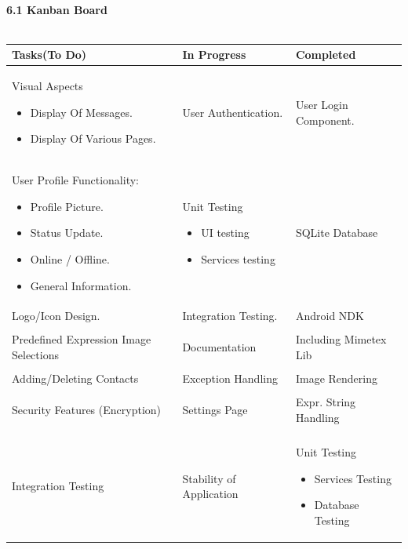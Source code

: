 \documentclass[29pt,a4paper]{moderncv}
\begin{document}
		\\ \noindent\textbf{6.1 Kanban Board} \\
  		\\	\begin{tabular}{| p{7cm} | p{7cm} | p{7cm} |}
				\hline
		    		\textbf{Tasks(To Do)} & \textbf{In Progress} & \textbf{Completed} \\ 
   				\hline
   				\hline
		    		Visual Aspects
		    		\begin{itemize}
			    		\item Display Of Messages.
			    		\item Display Of Various Pages.
		    		\end{itemize}
		    	 	& User Authentication. & User Login Component. \\ 
   				\hline
   				\hline
	   				User Profile Functionality:
	   				\begin{itemize}
	   					\item Profile Picture.
	   					\item Status Update.
	   					\item Online / Offline.
	   					\item General Information.
	   				\end{itemize}	
	   				& Unit Testing
	   				\begin{itemize}
	   					\item UI testing
		   				\item Services testing 
	   				\end {itemize}
	   				& SQLite Database\\
   				
				Logo/Icon Design. & Integration Testing. & Android NDK\\
				
				\\Predefined Expression Image Selections & Documentation & Including Mimetex Lib\\
				
				\\Adding/Deleting Contacts & Exception Handling & Image Rendering\\
				
				\\Security Features (Encryption) & Settings Page & Expr. String Handling\\
				
				\\Integration Testing & Stability of Application & 
				Unit Testing
				\begin{itemize}
					\item Services Testing
					\item Database Testing
				\end{itemize}
   				

\end{tabular}
\end{document}
